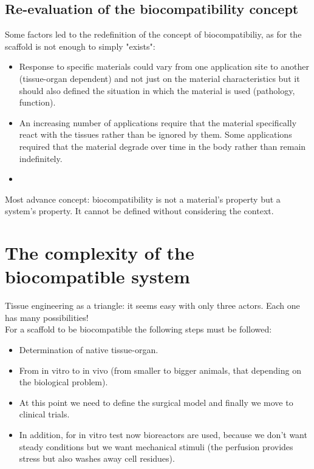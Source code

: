 	\subsection{Re-evaluation of the biocompatibility concept}
	Some factors led to the redefinition of the concept of biocompatibiliy, as for the scaffold is not enough to simply "exists":

	\begin{multicols}{2}
		\begin{itemize}
			\item Response to specific materials could vary from one application site to another (tissue-organ dependent) and not just on the material characteristics but it should also defined the situation in which the material is used (pathology, function).
			\item An increasing number of applications require that the material specifically react with the tissues rather than be ignored by them.
				Some applications required that the material degrade over time in the body rather than remain indefinitely.
			\item
		\end{itemize}
	\end{multicols}

	Most advance concept: biocompatibility is not a material's property but a system's property. It cannot be defined without considering the context.

\section{The complexity of the biocompatible system}
Tissue engineering as a triangle: it seems easy with only three actors.
Each one has many possibilities!
\\
For a scaffold to be biocompatible the following steps must be followed:

\begin{multicols}{2}
	\begin{itemize}
		\item Determination of native tissue-organ.
		\item From in vitro to in vivo (from smaller to bigger animals, that depending on the biological problem).
		\item At this point we need to define the surgical model and finally we move to clinical trials.
		\item In addition, for in vitro test now bioreactors are used, because we don't want steady conditions but we want mechanical stimuli (the perfusion provides stress but also washes away cell residues).
	\end{itemize}
\end{multicols}

